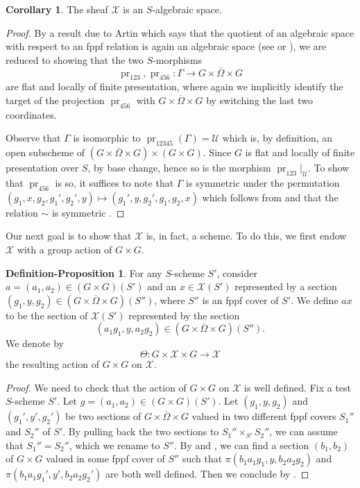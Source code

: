 \documentclass[11pt, reqno]{amsart}
\theoremstyle{plain}
\theoremstyle{definition}
\newtheorem{corollary}[theorem]{Corollary}
\newtheorem{definition-proposition}[theorem]{Definition-Proposition}
\DeclareMathOperator{\pr}{pr}	%
\begin{document}
\begin{corollary}
    The sheaf $\mathcal{X}$ is an $S$-algebraic space.
\end{corollary}

\begin{proof}
     By a result due to Artin which says that the quotient of an algebraic space with respect to an fppf relation is again an algebraic space (see \cite[corollaire~(10.4)]{Champsalgebrique} or \cite[04S6]{stacks-project}), we are reduced to showing that the two $S$-morphisms $$\pr_{123},\pr_{456}:\Gamma\rightarrow G\times\overline{\Omega}\times G$$ 
     are flat and locally of finite presentation, where again we implicitly identify the target of the projection $\pr_{456}$ with $ G\times\overline{\Omega}\times G$ by switching the last two coordinates.
     
     Observe that $\Gamma$ is isomorphic to $\pr_{12345}(\Gamma)=\mathcal{U}$ which is, by definition, an open subscheme of  $(G\times\overline{\Omega}\times G)\times( G\times G)$. Since $G$ is flat and locally of finite presentation over $S$, by base change, hence so is the morphism $\pr_{123}\vert_{\mathcal{U}}$. To show that $\pr_{456}$ is so, it suffices to note that $\Gamma$ is symmetric under the permutation $(g_1,x,g_2,g_1',g_2',y)\mapsto(g_1',y,g_2',g_1,g_2,x)$ which follows from  and that the relation $\sim$ is symmetric .
\end{proof}

Our next goal is to show that $\mathcal{X}$ is, in fact, a scheme. To do this, we first endow $\mathcal{X}$ with a group action of $G\times G$. 

\begin{definition-proposition}\label{definitionofgrpaction}
    For any $S$-scheme $S'$, consider $a=(a_1,a_2)\in (G\times G)(S')$ and an $x\in \mathcal{X}(S')$ represented by a section
$(g_1,y,g_2)\in( G\times\overline{\Omega}\times G)(S'')$, where $S''$ is an fppf cover of $S'$. We define $ax$ to be the section of $\mathcal{X}(S')$ represented by the section 
$$(a_1g_1, y, a_2g_2)\in ( G\times\overline{\Omega}\times G)(S'').$$
We denote by 
    $$\Theta\colon G\times \mathcal{X}\times G\longrightarrow \mathcal{X}$$
    the resulting action of $G\times G$ on $\mathcal{X}$.
\end{definition-proposition}

\begin{proof}
   We need to check that the action of $G\times G$ on $\mathcal{X}$ is well defined.
   Fix a test $S$-scheme $S'$.
   Let $g=(a_1,a_2)\in (G\times G)(S')$. 
   Let $(g_1, y, g_2)$ and $(g_1',y',g_2')$ be two sections of $G\times\overline{\Omega}\times G$ valued in two different fppf covers $S_1''$ and $S_2''$ of $S'$. By pulling back the two sections to $S_1''\times_{S'} S_2''$, we can assume that $S_1''=S_2''$, which we rename to $S''$. By  and \cite[exposé~XVIII, propostion~1.7]{SGA3II}, we can find a section $(b_1, b_2)$ of $G\times G$ valued in some fppf cover of $S''$ such that $\pi(b_1a_1g_1, y, b_2a_2g_2)$ and $\pi(b_1a_1g_1',y',b_2a_2g_2')$ are both well defined. Then we conclude by .
\end{proof}
\end{document}
